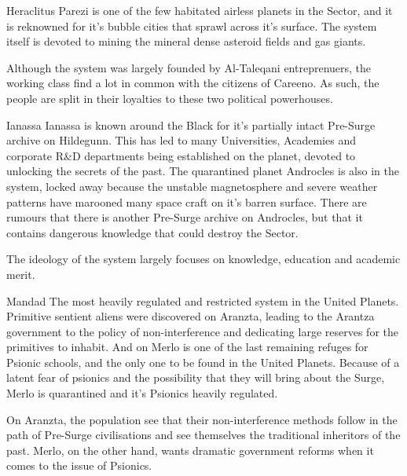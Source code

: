 \begin{multicols}{2}
  \begin{genericsection}{Heraclitus}
  Parezi is one of the few habitated airless planets in the Sector, and it is reknowned for it's bubble cities that sprawl across it's surface. The system itself is devoted to mining the mineral dense asteroid fields and gas giants. 
  
  Although the system was largely founded by Al-Taleqani entreprenuers, the working class find a lot in common with the citizens of Careeno. As such, the people are split in their loyalties to these two political powerhouses.
  \end{genericsection}
  
  \begin{genericsection}{Ianassa}
  Ianassa is known around the Black for it's partially intact Pre-Surge archive on Hildegunn. This has led to many Universities, Academies and corporate R\&D departments being established on the planet, devoted to unlocking the secrets of the past. The quarantined planet Androcles is also in the system, locked away because the unstable magnetosphere and severe weather patterns have marooned many space craft on it's barren surface. There are rumours that there is another Pre-Surge archive on Androcles, but that it contains dangerous knowledge that could destroy the Sector.
  
  The ideology of the system largely focuses on knowledge, education and academic merit.
  \end{genericsection}
  
  \begin{genericsection}{Mandad}
  The most heavily regulated and restricted system in the United Planets. Primitive sentient aliens were discovered on Aranzta, leading to the Arantza government to the policy of non-interference and dedicating large reserves for the primitives to inhabit. And on Merlo is one of the last remaining refuges for Psionic schools, and the only one to be found in the United Planets. Because of a latent fear of psionics and the possibility that they will bring about the Surge, Merlo is quarantined and it's Psionics heavily regulated.
  
  On Aranzta, the population see that their non-interference methods follow in the path of Pre-Surge civilisations and see themselves the traditional inheritors of the past. Merlo, on the other hand, wants dramatic government reforms when it comes to the issue of Psionics.
  \end{genericsection}
  

\end{multicols}

